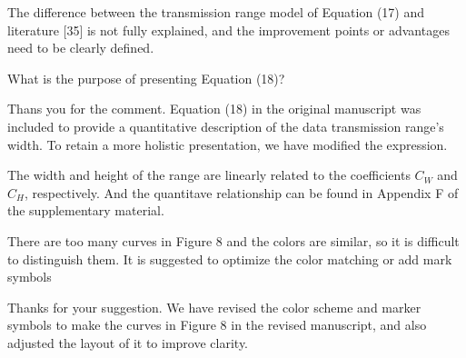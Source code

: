 \begin{revcomment}
	The difference between the transmission range model of Equation (17) and literature [35] is not fully explained, and the improvement points or advantages need to be clearly defined.
\end{revcomment}
\begin{revresponse}
	
\end{revresponse}

\begin{revcomment}
	What is the purpose of presenting Equation (18)?
\end{revcomment}
\begin{revresponse}
	Thans you for the comment.
	Equation (18) in the original manuscript was included to provide a quantitative description of the data transmission range's width.
	To retain a more holistic presentation, we have modified the expression.
	\begin{changes}
		The width and height of the range are linearly related to the coefficients $C_W$ and $C_H$, respectively.
		And the quantitave relationship can be found in Appendix F of the supplementary material.
	\end{changes}
\end{revresponse}

\begin{revcomment}
	There are too many curves in Figure 8 and the colors are similar, so it is difficult to distinguish them. It is suggested to optimize the color matching or add mark symbols
\end{revcomment}
\begin{revresponse}
	Thanks for your suggestion.
	We have revised the color scheme and marker symbols to make the curves in Figure 8 in the revised manuscript, and also adjusted the layout of it to improve clarity.
\end{revresponse}

